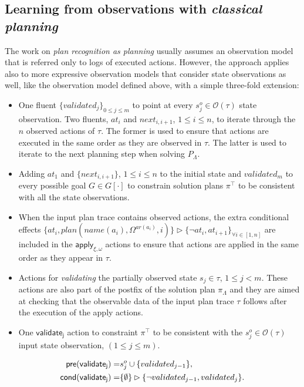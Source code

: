 \documentclass{article}
\newcommand{\pre}{\mathsf{pre}}     %
\newcommand{\cond}{\mathsf{cond}}   %
\begin{document}
\subsection{Learning from observations with {\em classical planning}}
The work on {\em plan recognition as planning} usually assumes an observation model that is referred only to logs of executed actions. However, the approach applies also to more expressive observation models that consider state observations as well, like the observation model defined above, with a simple three-fold extension:
\begin{itemize}
\item One fluent $\{validated_j\}_{0\leq j\leq m}$ to point at every $s_j^o\in\mathcal{O}(\tau)$ state observation. Two fluents, $at_i$ and $next_{i,i+1}$, {\small $1\leq i \leq n$}, to iterate through the $n$ observed actions of $\tau$. The former is used to ensure that actions are executed in the same order as they are observed in $\tau$. The latter is used to iterate to the next planning step when solving $P_{\Lambda}$.
\item Adding $at_1$ and $\{next_{i,i+1}\}$, {\small $1\leq i \leq n$} to the initial state and $validated_m$ to every possible goal $G\in G[\cdot]$ to constrain solution plans $\pi^\top$ to be consistent with all the state observations.

\item When the input plan trace contains observed actions, the extra conditional effects $\{at_{i},plan(name(a_i),\Omega^{ar(a_i)},i)\}\rhd\{\neg at_{i},at_{i+1}\}_{\forall i\in [1,n]}$ are included in the $\mathsf{apply_{\xi,\omega}}$ actions to ensure that actions are applied in the same order as they appear in $\tau$.\\

\item Actions for {\em validating} the partially observed state $s_j\in\tau$, {\tt\small $1\leq j< m$}. These actions are also part of the postfix of the solution plan $\pi_\Lambda$ and they are aimed at checking that the observable data of the input plan trace $\tau$ follows after the execution of the apply actions.


\item One $\mathsf{validate_{j}}$ action to constraint $\pi^\top$ to be consistent with the $s_j^o\in\mathcal{O}(\tau)$ input state observation, {\small $(1\leq j\leq m)$}.  
\end{itemize}
\begin{small}
\begin{align*}
\hspace*{7pt}\pre(\mathsf{validate_{j}})=&s_j^o\cup\{validated_{j-1}\},\\
\cond(\mathsf{validate_{j}})=&\{\emptyset\}\rhd\{\neg validated_{j-1}, validated_j\}.
\end{align*}
\end{small}
\end{document}
